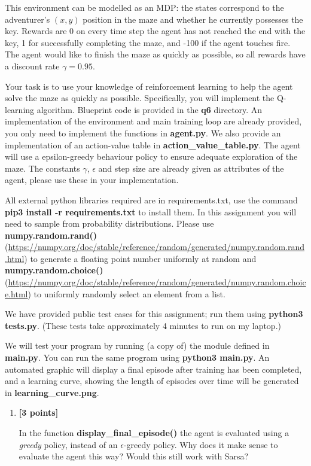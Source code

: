 \documentclass{article}
\newcounter{totalpoints}
\newcommand{\points}[1]{{\addtocounter{totalpoints}{#1}\textbf{[#1 points]}}}
\begin{document}
\begin{enumerate}
This environment can be modelled as an MDP: the states correspond to the adventurer's $(x,y)$ position in the maze and whether he currently possesses the key. Rewards are 0 on every time step the agent has not reached the end with the key, 1 for successfully completing the maze, and -100 if the agent touches fire. The agent would like to finish the maze as quickly as possible, so all rewards have a discount rate $\gamma = 0.95$.

Your task is to use your knowledge of reinforcement learning to help the agent solve the maze as quickly as possible. Specifically, you will implement the Q-learning algorithm. Blueprint code is provided in the \textbf{q6} directory. An implementation of the environment and main training loop are already provided, you only need to implement the functions in \textbf{agent.py}. We also provide an implementation of an action-value table in \textbf{action\_value\_table.py}. The agent will use a epsilon-greedy behaviour policy to ensure adequate exploration of the maze. The constants $\gamma$, $\epsilon$ and step size are already given as attributes of the agent, please use these in your implementation. 

All external python libraries required are in requirements.txt, use the command \textbf{pip3 install -r requirements.txt} to install them. In this assignment you will need to sample from probability distributions. Please use \textbf{numpy.random.rand()} (\url{https://numpy.org/doc/stable/reference/random/generated/numpy.random.rand.html}) to generate a  floating point number uniformly at random and \textbf{numpy.random.choice()} (\url{https://numpy.org/doc/stable/reference/random/generated/numpy.random.choice.html}) to uniformly randomly select an element from a list.  

We have provided public test cases for this assignment; run them using \textbf{python3 tests.py}.
(These tests take approximately 4 minutes to run on my laptop.)

We will test your program by running (a copy of) the module defined in \textbf{main.py}.  You can run the same program using \textbf{python3 main.py}.  An automated graphic will display a final episode after training has been completed, and a learning curve, showing the length of episodes over time will be generated in \textbf{learning\_curve.png}. 

\begin{enumerate}
    \item \points{3}
    In the function \textbf{display\_final\_episode()} the agent is evaluated using a \textit{greedy} policy, instead of an $\epsilon$-greedy policy.  Why does it make sense to evaluate the agent this way? Would this still work with Sarsa?
    \begin{answer}{1.5in}
    \end{answer}


\end{enumerate}
\end{enumerate}
\end{document}
